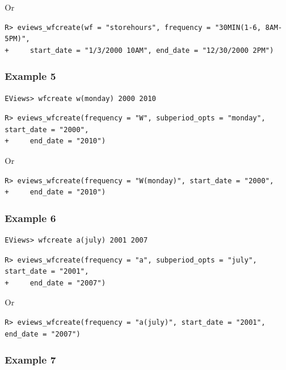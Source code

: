 Or

\begin{verbatim}
R> eviews_wfcreate(wf = "storehours", frequency = "30MIN(1-6, 8AM-5PM)",
+     start_date = "1/3/2000 10AM", end_date = "12/30/2000 2PM")
\end{verbatim}

\hypertarget{example-5-2}{%
\subsubsection{Example 5}\label{example-5-2}}

\begin{verbatim}
EViews> wfcreate w(monday) 2000 2010
\end{verbatim}

\begin{verbatim}
R> eviews_wfcreate(frequency = "W", subperiod_opts = "monday", start_date = "2000",
+     end_date = "2010")
\end{verbatim}

Or

\begin{verbatim}
R> eviews_wfcreate(frequency = "W(monday)", start_date = "2000",
+     end_date = "2010")
\end{verbatim}

\hypertarget{example-6-2}{%
\subsubsection{Example 6}\label{example-6-2}}

\begin{verbatim}
EViews> wfcreate a(july) 2001 2007
\end{verbatim}

\begin{verbatim}
R> eviews_wfcreate(frequency = "a", subperiod_opts = "july", start_date = "2001",
+     end_date = "2007")
\end{verbatim}

Or

\begin{verbatim}
R> eviews_wfcreate(frequency = "a(july)", start_date = "2001", end_date = "2007")
\end{verbatim}

\hypertarget{example-7-2}{%
\subsubsection{Example 7}\label{example-7-2}}


